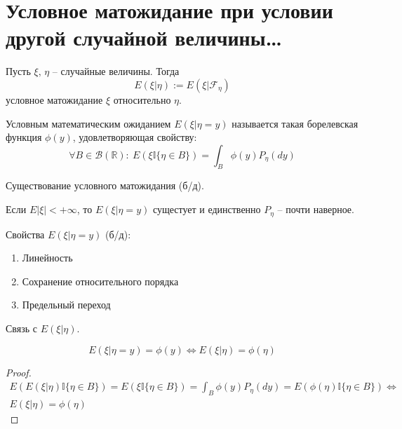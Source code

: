 \section{Условное матожидание при условии другой случайной величины\dots}
\begin{definition}
	Пусть $\xi,\, \eta$ -- случайные величины. Тогда
	\[E(\xi | \eta) := E(\xi | \mathcal{F}_\eta)\]
	условное матожидание $\xi$ относительно $\eta$.
\end{definition}

\begin{definition}
	Условным математическим ожиданием $E(\xi | \eta = y)$ называется такая борелевская функция $\phi(y)$, удовлетворяющая свойству:
	\[\forall B \in \mathcal{B}(\mathbb{R}):\: E(\xi\mathbb{I}\{\eta \in B\}) = \int_B \phi(y)P_\eta(dy)\]
\end{definition}

\begin{theorem}
	Существование условного матожидания (б/д).

	Если $E|\xi| < +\infty$, то $E(\xi | \eta = y)$ сущестует и единственно $P_\eta$ -- почти наверное.
\end{theorem}

\begin{lemma}
	Свойства $E(\xi | \eta = y)$ (б/д):
	\begin{enumerate}
		\item Линейность
		\item Сохранение относительного порядка
		\item Предельный переход
	\end{enumerate}
\end{lemma}

\begin{proposition}
	Связь с $E(\xi | \eta)$.

	\[E(\xi | \eta = y) = \phi(y) \Leftrightarrow E(\xi | \eta) = \phi(\eta)\]
\end{proposition}

\begin{proof}
	\begin{align*}
		E(E(\xi | \eta)\mathbb{I}\{\eta \in B\}) = E(\xi\mathbb{I}\{\eta \in B\}) = \int_B \phi(y)P_\eta(dy) = E(\phi(\eta)\mathbb{I}\{\eta \in B\}) \Leftrightarrow \\
		E(\xi | \eta) = \phi(\eta)
	\end{align*}
\end{proof}

